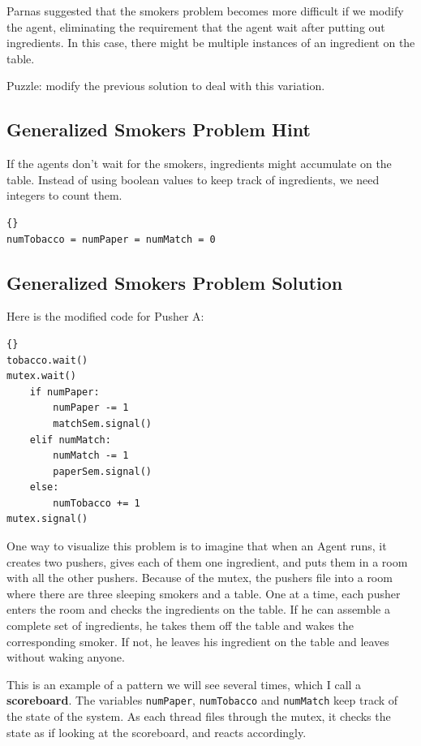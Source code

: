 \documentclass{book}
\newcommand{\clearemptydoublepage}{\newpage\cleardoublepage}
\begin{document}
Parnas suggested that the smokers problem becomes more
difficult if we modify the agent, eliminating the requirement
that the agent wait after putting out ingredients.  In this
case, there might be multiple instances of an ingredient on
the table.

Puzzle: modify the previous solution to deal with this
variation.

\clearemptydoublepage
\subsection{Generalized Smokers Problem Hint}

If the agents don't wait for the smokers, ingredients might
accumulate on the table.  Instead of using boolean values to
keep track of ingredients, we need integers to count them.

\begin{lstlisting}[title={Generalized Smokers problem hint}]{}
numTobacco = numPaper = numMatch = 0
\end{lstlisting}


\clearemptydoublepage
\subsection{Generalized Smokers Problem Solution}
\label{smoker}

Here is the modified code for Pusher A:

\begin{lstlisting}[title={Pusher A}]{}
tobacco.wait()
mutex.wait()
    if numPaper:
        numPaper -= 1
        matchSem.signal()
    elif numMatch:
        numMatch -= 1
        paperSem.signal()
    else: 
        numTobacco += 1
mutex.signal()
\end{lstlisting}

One way to visualize this problem is to imagine that when an
Agent runs, it creates two pushers, gives each of them one ingredient,
and puts them in a room with all the other pushers.  Because of the
mutex, the pushers file into a room where there are
three sleeping smokers and a table.  One at a time, each pusher enters
the room and checks the ingredients on the table.  If he can
assemble a complete set of ingredients, he takes them off the table
and wakes the corresponding smoker.  If not, he leaves his ingredient
on the table and leaves without waking anyone.

This is an example of a pattern we will see several times, which
I call a {\bf scoreboard}.  The variables {\tt numPaper}, {\tt numTobacco}
and {\tt numMatch} keep track of the state of the system.  As each
thread files through the mutex, it checks the state as if looking
at the scoreboard, and reacts accordingly.
\end{document}
